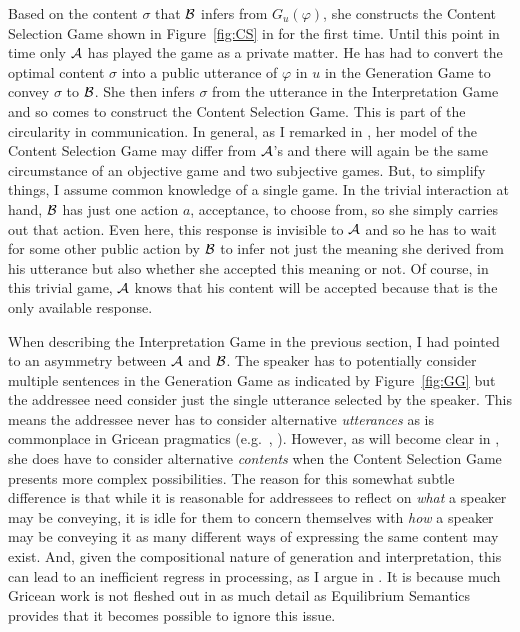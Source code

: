Based on the content $\sigma$ that $\cal B$ infers from $G_u(\varphi)$, she constructs the Content Selection Game shown in Figure~\ref{fig:CS} in  for the first time. Until this point in time only $\cal A$ has played the game as a private matter. He has had to convert the optimal content $\sigma$ into a public utterance of $\varphi$ in $u$ in the Generation Game to convey $\sigma$ to $\cal B$. She then infers $\sigma$ from the utterance in the Interpretation Game and so comes to construct the Content Selection Game. This is part of the circularity in communication. In general, as I remarked in , her model of the Content Selection Game may differ from $\cal A$'s and there will again be the same circumstance of an objective game and two subjective games. But, to simplify things, I assume common knowledge of a single game. In the trivial interaction at hand, $\cal B$ has just one action $a$, acceptance, to choose from, so she simply carries out that action. Even here, this response is invisible to $\cal A$ and so he has to wait for some other public action by $\cal B$ to infer not just the meaning she derived from his utterance but also whether she accepted this meaning or not. Of course, in this trivial game, $\cal A$ knows that his content will be accepted because that is the only available response.

When describing the Interpretation Game in the previous section, I had point\-ed to an asymmetry between $\cal A$ and $\cal B$. The speaker has to potentially consider multiple sentences in the Generation Game as indicated by Figure~\ref{fig:GG} but the addressee need consider just the single utterance selected by the speaker. This means the addressee never has to consider alternative \emph{utterances} as is commonplace in Gricean pragmatics (e.g.\ \citealt{horn:sploe, horn:qr}, \citealt{levinson:pragmatics, levinson:pm}). However, as will become clear in , she does have to consider alternative \emph{contents} when the Content Selection Game presents more complex possibilities. The reason for this somewhat subtle difference is that while it is reasonable for addressees to reflect on \emph{what} a speaker may be conveying, it is idle for them to concern themselves with \emph{how} a speaker may be conveying it as many different ways of expressing the same content may exist. And, given the compositional nature of generation and interpretation, this can lead to an inefficient regress in processing, as I argue in . It is because much Gricean work is not fleshed out in as much detail as Equilibrium Semantics provides that it becomes possible to ignore this issue.

